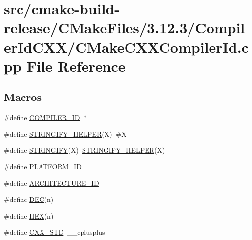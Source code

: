 \hypertarget{cmake-build-release_2CMakeFiles_23_812_83_2CompilerIdCXX_2CMakeCXXCompilerId_8cpp}{}\section{src/cmake-\/build-\/release/\+C\+Make\+Files/3.12.3/\+Compiler\+Id\+C\+X\+X/\+C\+Make\+C\+X\+X\+Compiler\+Id.cpp File Reference}
\label{cmake-build-release_2CMakeFiles_23_812_83_2CompilerIdCXX_2CMakeCXXCompilerId_8cpp}
\subsection*{Macros}
\begin{DoxyCompactItemize}
\item 
\#define \hyperlink{cmake-build-release_2CMakeFiles_23_812_83_2CompilerIdCXX_2CMakeCXXCompilerId_8cpp_a81dee0709ded976b2e0319239f72d174}{C\+O\+M\+P\+I\+L\+E\+R\+\_\+\+ID}~\char`\"{}\char`\"{}
\item 
\#define \hyperlink{cmake-build-release_2CMakeFiles_23_812_83_2CompilerIdCXX_2CMakeCXXCompilerId_8cpp_a2ae9b72bb13abaabfcf2ee0ba7d3fa1d}{S\+T\+R\+I\+N\+G\+I\+F\+Y\+\_\+\+H\+E\+L\+P\+ER}(X)~\#X
\item 
\#define \hyperlink{cmake-build-release_2CMakeFiles_23_812_83_2CompilerIdCXX_2CMakeCXXCompilerId_8cpp_a43e1cad902b6477bec893cb6430bd6c8}{S\+T\+R\+I\+N\+G\+I\+FY}(X)~\hyperlink{cmake-build-release_2CMakeFiles_23_812_83_2CompilerIdCXX_2CMakeCXXCompilerId_8cpp_a2ae9b72bb13abaabfcf2ee0ba7d3fa1d}{S\+T\+R\+I\+N\+G\+I\+F\+Y\+\_\+\+H\+E\+L\+P\+ER}(X)
\item 
\#define \hyperlink{cmake-build-release_2CMakeFiles_23_812_83_2CompilerIdCXX_2CMakeCXXCompilerId_8cpp_adbc5372f40838899018fadbc89bd588b}{P\+L\+A\+T\+F\+O\+R\+M\+\_\+\+ID}
\item 
\#define \hyperlink{cmake-build-release_2CMakeFiles_23_812_83_2CompilerIdCXX_2CMakeCXXCompilerId_8cpp_aba35d0d200deaeb06aee95ca297acb28}{A\+R\+C\+H\+I\+T\+E\+C\+T\+U\+R\+E\+\_\+\+ID}
\item 
\#define \hyperlink{cmake-build-release_2CMakeFiles_23_812_83_2CompilerIdCXX_2CMakeCXXCompilerId_8cpp_ad1280362da42492bbc11aa78cbf776ad}{D\+EC}(n)
\item 
\#define \hyperlink{cmake-build-release_2CMakeFiles_23_812_83_2CompilerIdCXX_2CMakeCXXCompilerId_8cpp_a46d5d95daa1bef867bd0179594310ed5}{H\+EX}(n)
\item 
\#define \hyperlink{cmake-build-release_2CMakeFiles_23_812_83_2CompilerIdCXX_2CMakeCXXCompilerId_8cpp_a34cc889e576a1ae6c84ae9e0a851ba21}{C\+X\+X\+\_\+\+S\+TD}~\+\_\+\+\_\+cplusplus
\end{DoxyCompactItemize}
